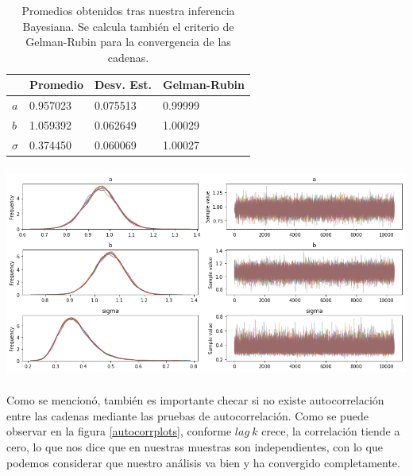 \documentclass[onecolumn,           %
               showpacs,            %
               preprintnumbers,     %
               aps,                 %
               prl,          	    %
               letterpaper,             %
               superscriptaddress,      %
               nofootinbib,         %
               tightenlines,        %
               floats,floatfix      %
               ,usenatbib,
               ]{revtex4-1}
\begin{document}
\begin{table}[h!]
\centering
\begin{tabular}{||l|l|l|l||} 
 \hline
 & \textbf{Promedio} & \textbf{Desv. Est.} & \textbf{Gelman-Rubin} \\ [0.5ex] 
 \hline\hline
$a$ & 0.957023 & 0.075513 & 0.99999 \\
\hline
$b$ & 1.059392 & 0.062649 & 1.00029\\
\hline
$\sigma$ & 0.374450 & 0.060069 & 1.00027
 \\ [1ex] 
 \hline
\end{tabular}
\caption{\footnotesize{Promedios obtenidos tras nuestra inferencia Bayesiana. Se calcula tambi\'en el criterio de Gelman-Rubin para la convergencia de las cadenas.}}
\label{tabla1}
\end{table}

\begin{minipage}{\textwidth}
\centering
\includegraphics[height=7cm]{chain.png}
\label{chain}
\end{minipage}

Como se mencion\'o, tambi\'en es importante checar si no existe autocorrelaci\'on entre las cadenas mediante las pruebas de autocorrelaci\'on. Como se puede observar en la figura \ref{autocorrplots}, conforme $lag\ k$ crece, la correlaci\'on tiende a cero, lo que nos dice que en nuestras muestras son independientes, con lo que podemos considerar que nuestro an\'alisis va bien y ha convergido completamente. 
\end{document}
